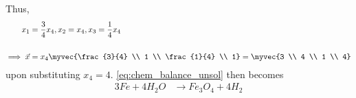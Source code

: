 %
Thus, 
\begin{align}
\label{eq:chem_balance_mat_sol}
x_1 &= \frac{3}{4}x_4, x_2 = x_4, x_3 = \frac{1}{4}x_4
\\
\\
\implies 
\vec{x} &= x_4\myvec{\frac{3}{4} \\ 1 \\ \frac{1}{4} \\ 1}= \myvec{3 \\ 4 \\ 1 \\ 4}
\end{align}
%
upon substituting $x_4 = 4$.
%
\eqref{eq:chem_balance_unsol} then becomes
%
\begin{align}
\label{eq:chem_balance_final}
3Fe+4H_2 O &\rightarrow Fe_3 O_4 + 4H_2
\end{align}

